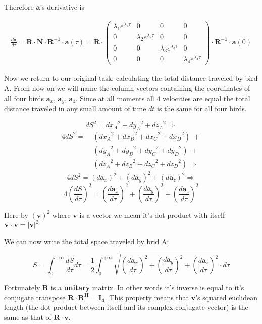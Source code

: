 \documentclass{article}
\newcommand{\vect}[1]{\mathbf{#1}}
\newcommand{\mat}[1]{\mathbf{#1}}
\begin{document}
Therefore $\vect a$'s derivative is

\begin{align*}
    \frac{d\vect a}{d\tau} = \mat{R}\cdot\mat{N}\cdot\mat{R^{-1}}\cdot\vect a(\tau) = \mat{R} \cdot \begin{pmatrix}
        \lambda_1e^{\lambda_1\tau} & 0 & 0 & 0 \\
        0 & \lambda_2e^{\lambda_2\tau} & 0 & 0 \\
        0 & 0 & \lambda_3e^{\lambda_3\tau} & 0 \\
        0 & 0 & 0 & \lambda_4e^{\lambda_4\tau}
    \end{pmatrix} \cdot \mat{R^{-1}}\cdot \vect a(0)
\end{align*}

Now we return to our original task: calculating the total distance traveled by bird A. From now on we will name the column vectors containing the coordinates of all four birds $\vect a_x$, $\vect a_y$, $\vect a_z$. Since at all moments all 4 velocities are equal the total distance traveled in any small amount of time $dt$ is the same for all four birds. 

\[dS^2 = {dx_A}^2 + {dy_A}^2 + {dz_A}^2 \Rightarrow\]
\begin{align*}
    4dS^2 = \; &({dx_A}^2 + {dx_B}^2 + {dx_C}^2 + {dx_D}^2) \; + \\
        &({dy_A}^2 + {dy_B}^2 + {dy_C}^2 + {dy_D}^2) \; + \\
        &({dz_A}^2 + {dz_B}^2 + {dz_C}^2 + {dz_D}^2) \Rightarrow
\end{align*}
\[4dS^2 = (d\vect a_x)^2 + (d\vect a_y)^2 + (d\vect a_z)^2 \Rightarrow\]
\[4(\frac{dS}{d\tau})^2 = (\frac{d\vect a_x}{d\tau})^2 + (\frac{d\vect a_y}{d\tau})^2 + (\frac{d\vect a_z}{d\tau})^2\]

Here by $(\vect v)^2$ where $\vect v$ is a vector we mean it's dot product with itself $\vect v \cdot \vect v = \abs{\vect v}^2$

We can now write the total space traveled by brid A:

\[S = \int_0^{+\infty}\frac{dS}{d\tau}d\tau = \frac{1}{2}\int_0^{+\infty}\sqrt{(\frac{d\vect a_x}{d\tau})^2 + (\frac{d\vect a_y}{d\tau})^2 + (\frac{d\vect a_z}{d\tau})^2}\cdot d\tau\]

Fortunately $\mat{R}$ is a \textbf{unitary} matrix. In other words it's inverse is equal to it's conjugate transpose $\mat{R}\cdot\mat{R^H} = \mat{I_4}$. This property means that $\vect v$'s squared euclidean length (the dot product between itself and its complex conjugate vector) is the same as that of $\mat{R} \cdot \vect v$.
\end{document}
